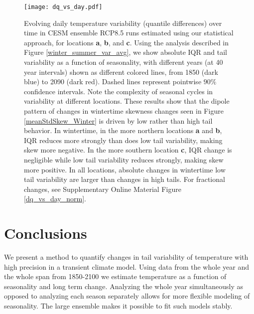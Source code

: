 \documentclass{ametsoc}
\newcommand\bigfigwidth{\textwidth}
\begin{document}
\begin{figure*}[ht]
\centerline{\texttt{[image: dq\_vs\_day.pdf]}}
\caption{\small{Evolving daily temperature variability (quantile differences) over time in CESM ensemble RCP8.5 runs estimated using our statistical approach, for locations \textbf{a}, \textbf{b}, and \textbf{c}. Using the analysis described in Figure \ref{winter_summer_var_avg},
 we show absolute IQR and tail variability as a function of seasonality, with different years (at 40 year intervals) shown as different colored lines, %
from 1850 (dark blue) to 2090 (dark red).
Dashed lines represent pointwise $90\%$ confidence intervals. Note the complexity of seasonal cycles in variability at different locations. These results show that the dipole pattern of changes in wintertime skewness changes seen in Figure \ref{meanStdSkew_Winter} %
is driven by low rather than high tail behavior. In wintertime, in the more northern locations \textbf{a} and \textbf{b}, IQR reduces more strongly than does low tail variability, making skew more negative. In the more southern location \textbf{c}, IQR change is negligible while low tail variability reduces strongly, making skew more positive. In all locations, absolute changes in wintertime low tail variability are larger than changes in high tails. For fractional changes, see Supplementary Online Material Figure \ref{dq_vs_day_norm}. }}
\label{dq_vs_day}
\end{figure*}


\section{Conclusions}
\label{sec:conclusions}

We present a method to quantify changes in tail variability of temperature with high precision in a transient climate model. Using data from the whole year and the whole span from 1850-2100 we estimate temperature as a function of seasonality and long term change. Analyzing the whole year simultaneously as opposed to analyzing each season separately allows for more flexible modeling of seasonality. The large ensemble makes it possible to fit such models stably.
\end{document}
